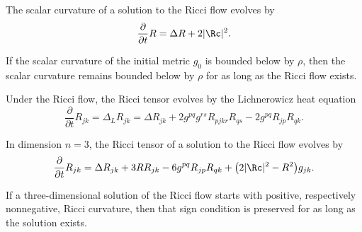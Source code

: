 \begin{lemma}
\label{ch06-lem-scalar-curvature-under-ricci-flow}

The scalar curvature of a solution to the Ricci flow evolves by
\[
\frac{\partial}{\partial t}R=\Delta R+2|\Rc|^2.
\]
\end{lemma}

\begin{lemma}
\label{ch06-lem-preservation-scalar-lower-bounds}

If the scalar curvature of the initial metric \(g_0\) is bounded below by \(\rho\), then the scalar curvature remains bounded below by \(\rho\) for as long as the Ricci flow exists.
\end{lemma}

\begin{lemma}
\label{ch06-lem-ricci-evolution-general-dimension}

Under the Ricci flow, the Ricci tensor evolves by the Lichnerowicz heat equation
\[
\frac{\partial}{\partial t}R_{jk}=\Delta_L R_{jk}=\Delta R_{jk}+2g^{pq}g^{rs}R_{pjkr}R_{qs}-2g^{pq}R_{jp}R_{qk}.
\]
\end{lemma}

\begin{lemma}
\label{ch06-lem-ricci-evolution-dimension-three}

In dimension \(n=3\), the Ricci tensor of a solution to the Ricci flow evolves by
\[
\frac{\partial}{\partial t}R_{jk}=\Delta R_{jk}+3RR_{jk}-6g^{pq}R_{jp}R_{qk}+\bigl(2|\Rc|^2-R^2\bigr)g_{jk}.
\]
\end{lemma}

\begin{corollary}
\label{ch06-cor-preservation-ricci-sign-three}

If a three-dimensional solution of the Ricci flow starts with positive, respectively nonnegative, Ricci curvature, then that sign condition is preserved for as long as the solution exists.
\end{corollary}

